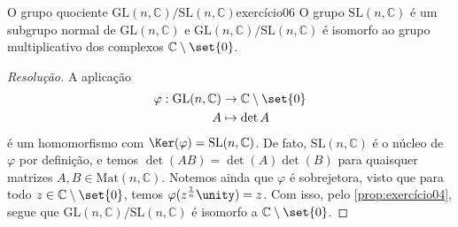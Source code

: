 \begin{proposition}{O grupo quociente \(\mathrm{GL}(n,\mathbb{C})/\mathrm{SL}(n,\mathbb{C})\)}{exercício06}
    O grupo \(\mathrm{SL}(n,\mathbb{C})\) é um subgrupo normal de \(\mathrm{GL}(n,\mathbb{C})\) e \(\mathrm{GL}(n,\mathbb{C})/\mathrm{SL}(n,\mathbb{C})\) é isomorfo ao grupo multiplicativo dos complexos \(\mathbb{C}\setminus\set{0}\).
\end{proposition}
\begin{proof}[Resolução]
    A aplicação
    \begin{align*}
        \varphi : \mathrm{GL}(n, \mathbb{C}) &\to \mathbb{C}\setminus\set{0}\\
                                           A &\mapsto \det{A}
    \end{align*}
    é um homomorfismo com \(\Ker(\varphi) = \mathrm{SL}(n,\mathbb{C})\). De fato, \(\mathrm{SL}(n,\mathbb{C})\) é o núcleo de \(\varphi\) por definição, e temos \(\det(AB)=\det(A)\det(B)\) para quaisquer matrizes \(A,B \in \mathrm{Mat}(n,\mathbb{C})\). Notemos ainda que \(\varphi\) é sobrejetora, visto que para todo \(z \in \mathbb{C}\setminus\set{0}\), temos \(\varphi(z^{\frac1n} \unity) = z\). Com isso, pelo \cref{prop:exercício04}, segue que \(\mathrm{GL}(n,\mathbb{C})/\mathrm{SL}(n,\mathbb{C})\) é isomorfo a \(\mathbb{C}\setminus \set{0}\).
\end{proof}
